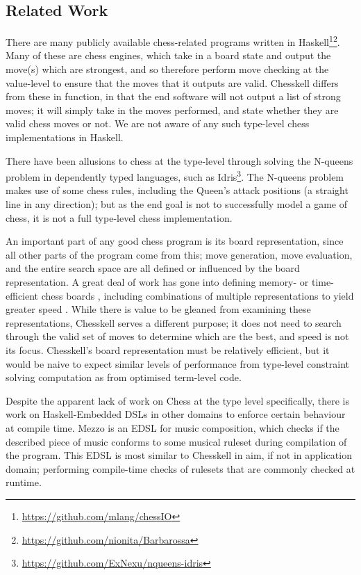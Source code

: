 \documentclass[12pt, a4paper, bibliography=totocnumbered]{scrartcl}
\begin{document}

\subsection{Related Work}

There are many publicly available chess-related programs written in Haskell\footnote{\url{https://github.com/mlang/chessIO}}\footnote{\url{https://github.com/nionita/Barbarossa}}. Many of these are chess engines, which take in a board state and output the move(s) which are strongest, and so therefore perform move checking at the value-level to ensure that the moves that it outputs are valid. Chesskell differs from these in function, in that the end software will not output a list of strong moves; it will simply take in the moves performed, and state whether they are valid chess moves or not. We are not aware of any such type-level chess implementations in Haskell.

There have been allusions to chess at the type-level through solving the N-queens problem in dependently typed languages, such as Idris\footnote{\url{https://github.com/ExNexu/nqueens-idris}}. The N-queens problem makes use of some chess rules, including the Queen's attack positions (a straight line in any direction); but as the end goal is not to successfully model a game of chess, it is not a full type-level chess implementation.

An important part of any good chess program is its board representation, since all other parts of the program come from this; move generation, move evaluation, and the entire search space are all defined or influenced by the board representation. A great deal of work has gone into defining memory- or time-efficient chess boards \cite{bitboard} \cite{searchtables}, including combinations of multiple representations to yield greater speed \cite{bitandccr}. While there is value to be gleaned from examining these representations, Chesskell serves a different purpose; it does not need to search through the valid set of moves to determine which are the best, and speed is not its focus. Chesskell's board representation must be relatively efficient, but it would be naive to expect similar levels of performance from type-level constraint solving computation as from optimised term-level code.

Despite the apparent lack of work on Chess at the type level specifically, there is work on Haskell-Embedded DSLs in other domains to enforce certain behaviour at compile time. Mezzo \cite{mezzohaskellsymposium} is an EDSL for music composition, which checks if the described piece of music conforms to some musical ruleset during compilation of the program. This EDSL is most similar to Chesskell in aim, if not in application domain; performing compile-time checks of rulesets that are commonly checked at runtime.
\end{document}
